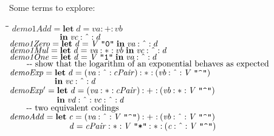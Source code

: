 \documentclass{article}
\newlength{\lwidth}\setlength{\lwidth}{4.5cm}
\newlength{\cwidth}\setlength{\cwidth}{8mm} %
\newcommand{\Conid}[1]{\mathit{#1}}
\newcommand{\Varid}[1]{\mathit{#1}}
\begin{document}
Some terms to explore:
\begin{tabbing}
\qquad\=\hspace{\lwidth}\=\hspace{\cwidth}\=\+\kill
${\Varid{demo1Add}\mathrel{=}\mathbf{let}\;\Varid{d}\mathrel{=}\Varid{va}\mathbin{:+:}\Varid{vb}}$\\
${\phantom{\Varid{demo1Add}\mathrel{=}\mbox{}}\mathbf{in}\;\Varid{vc}\mathbin{:\char94 :}\Varid{d}}$\\
${\Varid{demo1Zero}\mathrel{=}\mathbf{let}\;\Varid{d}\mathrel{=}\Conid{V}\;\text{\ttfamily \char34 0\char34}\;\mathbf{in}\;\Varid{va}\mathbin{:\char94 :}\Varid{d}}$\\
${\Varid{demo1Mul}\mathrel{=}\mathbf{let}\;\Varid{d}\mathrel{=}\Varid{va}\mathbin{:*:}\Varid{vb}\;\mathbf{in}\;\Varid{vc}\mathbin{:\char94 :}\Varid{d}}$\\
${\Varid{demo1One}\mathrel{=}\mathbf{let}\;\Varid{d}\mathrel{=}\Conid{V}\;\text{\ttfamily \char34 1\char34}\;\mathbf{in}\;\Varid{va}\mathbin{:\char94 :}\Varid{d}}$\\
${}$\\
${\mbox{\qquad-{}-  show that the logarithm of an exponential behaves as expected}}$\\
${\Varid{demoExp}\mathrel{=}\mathbf{let}\;\Varid{d}\mathrel{=}(\Varid{va}\mathbin{:\char94 :}\Varid{cPair})\mathbin{:*:}(\Varid{vb}\mathbin{:\char94 :}\Conid{V}\;\text{\ttfamily \char34 \char94 \char34})}$\\
${\phantom{\Varid{demoExp}\mathrel{=}\mbox{}}\mathbf{in}\;\Varid{vc}\mathbin{:\char94 :}\Varid{d}}$\\
${\Varid{demoExp'}\mathrel{=}\mathbf{let}\;\Varid{d}\mathrel{=}(\Varid{va}\mathbin{:*:}\Varid{cPair})\mathbin{:+:}(\Varid{vb}\mathbin{:*:}\Conid{V}\;\text{\ttfamily \char34 \char94 \char34})}$\\
${\phantom{\Varid{demoExp'}\mathrel{=}\mbox{}}\mathbf{in}\;\Varid{vd}\mathbin{:\char94 :}\Varid{vc}\mathbin{:\char94 :}\Varid{d}}$\\
${}$\\
${\mbox{\qquad-{}-  two equivalent codings                 }}$\\
${\Varid{demoAdd}\mathrel{=}\mathbf{let}\;\Varid{c}\mathrel{=}(\Varid{va}\mathbin{:\char94 :}\Conid{V}\;\text{\ttfamily \char34 \char94 \char34})\mathbin{:+:}(\Varid{vb}\mathbin{:\char94 :}\Conid{V}\;\text{\ttfamily \char34 \char94 \char34})}$\\
${\phantom{\Varid{demoAdd}\mathrel{=}\mathbf{let}\;\mbox{}}\Varid{d}\mathrel{=}\Varid{cPair}\mathbin{:*:}\Conid{V}\;\text{\ttfamily \char34 *\char34}\mathbin{:*:}(\Varid{c}\mathbin{:\char94 :}\Conid{V}\;\text{\ttfamily \char34 \char94 \char34})}$\\

\end{tabbing}
\end{document}
